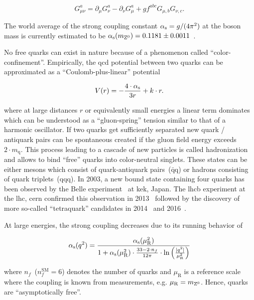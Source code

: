 \begin{equation}
G_{\mu\nu}^{a}=\partial_{\mu} G_\nu^{a}-\partial_{\nu} G_{\mu}^{a}+gf^{abc}G_{\mu,b}G_{\nu,c}.
\end{equation}

The world average of the strong coupling constant ${\alpha_\mathrm{s}}=g/(4\pi^2)$ at the \zboson boson mass is currently estimated to be ${\alpha_\mathrm{s}}(m_{{\mathrm{Z}^{0}}})=0.1181\pm0.0011$~\cite{Olive:2016xmw}.

No free quarks can exist in nature because of a phenomenon called ``color-confinement''. Empirically, the \gls{qcd} potential between two quarks can be approximated as a ``Coulomb-plus-linear'' potential~\cite{Sumino2003173}

\begin{equation}
V(r)=-\frac{4\cdot{\alpha_\mathrm{s}}}{3r}+k\cdot r.
\end{equation}

where at large distances $r$ or equivalently small energies a linear term dominates which can be understood as a ``gluon-spring'' tension similar to that of a harmonic oscillator. If two quarks get sufficiently separated new quark / antiquark pairs can be spontaneous created if the gluon field energy exceeds $2\cdot m_{\mathrm{q}}$. This process leading to a cascade of new particles is called hadronization and allows to bind ``free'' quarks into color-neutral singlets. These states can be either mesons which consist of quark-antiquark pairs~($\bar{\mathrm{q}}\mathrm{q}$) or hadrons consisting of quark triplets~($\mathrm{qqq}$). In 2003, a new bound state containing four quarks has been observed by the Belle experiment~\cite{PhysRevLett.91.262001} at \gls{kek}, Japan. The \gls{lhcb} experiment at the \gls{lhc}, \gls{cern} confirmed this observation in 2013~\cite{Aaij:2013zoa} followed by the discovery of more so-called ``tetraquark'' candidates in 2014~\cite{Aaij:2014jqa} and 2016~\cite{Aaij:2016iza}.

At large energies, the strong coupling decreases due to its running behavior of

\begin{equation}
{\alpha_\mathrm{s}}(q^2)=\frac{{\alpha_\mathrm{s}}(\mu_\mathrm{R}^{2})}{1+{\alpha_\mathrm{s}}(\mu_\mathrm{R}^2)\cdot\tfrac{33-2\cdot n_f}{12\pi}\cdot\ln\Big(\tfrac{|q^2|}{\mu_\mathrm{R}^{2}}\Big)}
\end{equation}

where $n_f$~($n^\mathrm{SM}_f=6$) denotes the number of quarks and $\mu_\mathrm{R}$ is a reference scale where the coupling is known from measurements, e.g. $\mu_\mathrm{R}=m_{{\mathrm{Z}^{0}}}$. Hence, quarks are ``asymptotically free''.





